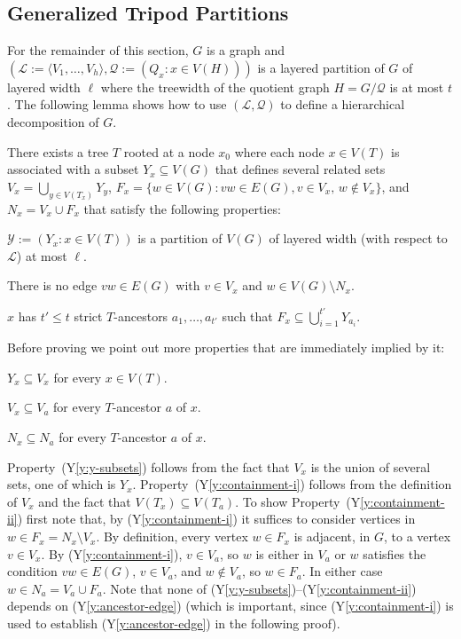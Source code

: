 \documentclass{patmorin}
\newcommand{\ylabel}[1]{\label{y:#1}}
\newcommand{\yref}[1]{(Y\ref{y:#1})}
\begin{document}
\subsection{Generalized Tripod Partitions}

For the remainder of this section, $G$ is a graph and $(\mathcal{L}:=\langle V_1,\ldots,V_h\rangle,\mathcal{Q}:=(Q_x: x\in V(H)))$ is a layered partition of $G$ of layered width $\ell$ where the treewidth of the quotient graph $H=G/\mathcal{Q}$ is at most $t$.  The following lemma shows how to use $(\mathcal{L},\mathcal{Q})$ to define a hierarchical decomposition of $G$.

\begin{lem}
  There exists a tree $T$ rooted at a node $x_0$ where each node $x\in V(T)$ is associated with a subset $Y_x\subseteq V(G)$ that defines several related sets $V_x = \bigcup_{y\in V(T_x)} Y_y$, $F_x=\{w\in V(G): vw\in E(G), v\in V_x,\, w\not\in V_x\}$, and $N_x=V_x\cup F_x$ that satisfy the following properties:
  \begin{compactenum}[(Y1)]
    \item\ylabel{thickness} $\mathcal{Y}:=(Y_x: x\in V(T))$ is a partition of $V(G)$ of layered width (with respect to $\mathcal{L}$) at most $\ell$.
    \item\ylabel{separator} There is no edge $vw\in E(G)$ with $v\in V_x$ and $w\in V(G)\setminus N_x$. 
    \item\ylabel{ancestor-edge} $x$ has $t'\le t$ strict $T$-ancestors $a_1,\ldots,a_{t'}$ such that $F_x \subseteq \bigcup_{i=1}^{t'} Y_{a_i}$.
  \end{compactenum}
\end{lem}

Before proving  we point out more properties that are immediately implied by it:

\begin{compactenum}[(Y1)]\setcounter{enumi}{3}
  \item\ylabel{y-subsets} $Y_x\subseteq V_x$ for every $x\in V(T)$. 
  \item\ylabel{containment-i} $V_x\subseteq V_a$ for every $T$-ancestor $a$ of $x$. 
  \item\ylabel{containment-ii}$N_x\subseteq N_a$ for every $T$-ancestor $a$ of $x$.
\end{compactenum}

Property~\yref{y-subsets} follows from the fact that $V_x$ is the union of several sets, one of which is $Y_x$.  Property~\yref{containment-i} follows from the definition of $V_x$ and the fact that $V(T_x)\subseteq V(T_a)$. To show Property~\yref{containment-ii} first note that, by \yref{containment-i} it suffices to consider vertices in $w\in F_x=N_x\setminus V_x$. By definition, every vertex $w\in F_x$ is adjacent, in $G$, to a vertex $v\in V_x$.  By \yref{containment-i}, $v\in V_a$, so $w$ is either in $V_a$ or $w$ satisfies the condition $vw\in E(G)$, $v\in V_a$, and $w\not\in V_a$, so $w\in F_a$.  In either case $w\in N_a=V_a\cup F_a$.  Note that none of \yref{y-subsets}--\yref{containment-ii} depends on \yref{ancestor-edge} (which is important, since \yref{containment-i} is used to establish \yref{ancestor-edge} in the following proof).
\end{document}
